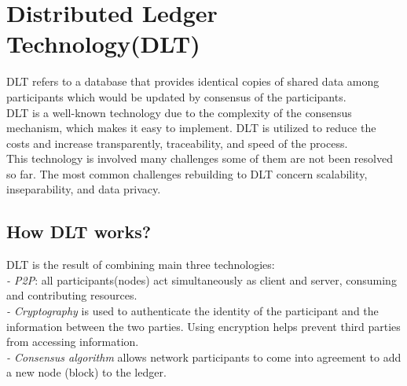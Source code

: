 \section{Distributed Ledger Technology(DLT)} 
DLT refers to a database that provides identical copies of shared data among participants which would be updated by consensus of the participants. \\
DLT is a well-known technology due to the complexity of the consensus mechanism, which makes it easy to implement. 
DLT is utilized to reduce the costs and increase transparently, traceability, and speed of the process.\\
This technology is involved many challenges some of them are not been resolved so far. The most common challenges rebuilding to DLT concern scalability, inseparability, and data privacy\cite{Ugarte}. 

\subsection{How DLT works?}
DLT is the result of combining main three technologies:\\
\hspace{1cm}\textit{-  P2P}: all participants(nodes) act simultaneously as client and server, consuming and contributing resources.\\
\hspace{1cm}\textit{- Cryptography} is used to authenticate the identity of the participant and the information between the two parties. Using encryption helps prevent third parties from accessing information. \\
\hspace{1cm}\textit{- Consensus algorithm} allows network participants to come into agreement to add a new node (block) to the ledger\cite{Ugarte}.\\
